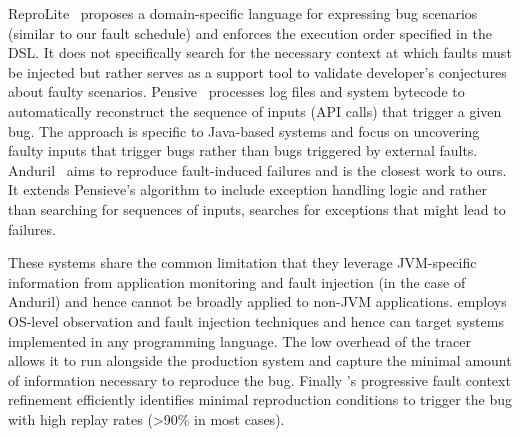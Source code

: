 ReproLite~\cite{reprolite} proposes a domain-specific language for expressing bug scenarios (similar to our fault schedule) and enforces the execution order specified in the DSL.
It does not specifically search for the necessary  context at which faults must be injected but rather serves as a support tool to validate developer's conjectures about faulty scenarios.
Pensive~\cite{pensieve} processes log files and system bytecode to automatically reconstruct the sequence of inputs (API calls) that trigger a given bug.
The approach is specific to Java-based systems and focus on uncovering faulty inputs that trigger bugs rather than bugs triggered by external faults.
Anduril~\cite{anduril} aims to reproduce fault-induced failures and is the closest work to ours.
It extends Pensieve's algorithm to include exception handling logic and rather than searching for sequences of inputs, searches for exceptions that might lead to failures.

These systems share the common limitation that they leverage JVM-specific information from application monitoring and fault injection (in the case of Anduril) and hence cannot be broadly applied to non-JVM applications. 
\sys employs OS-level observation and fault injection techniques and hence can target systems implemented in any programming language.
The low overhead of the tracer allows it to run alongside the production system and capture the minimal amount of information necessary to reproduce the bug.
Finally \sys's progressive fault context refinement efficiently identifies minimal reproduction conditions to trigger the bug with high replay rates (>90\% in most cases).



